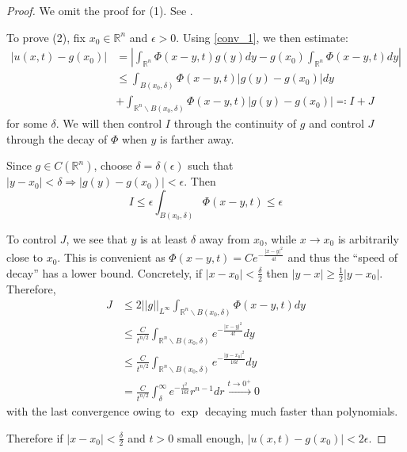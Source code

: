 \documentclass[openany, amssymb, psamsfonts]{amsart}
\theoremstyle{definition}
\numberwithin{equation}{section}
\newcommand{\bbr}{\mathbb{R}}
\let\implies\Rightarrow
\begin{document}
\begin{proof}
    We omit the proof for (1). See \cite{Evans}.

    To prove (2), fix $x_0 \in \bbr^n$ and $\epsilon > 0$. Using \autoref{conv_1}, we then estimate:
    \begin{align*}
        |u(x, t) - g(x_0)| &= |\int_{\bbr^n} \Phi(x-y, t) g(y) dy - g(x_0) \int_{\bbr^n} \Phi(x-y, t) dy| \\
        &\leq \int_{B(x_0, \delta)} \Phi(x-y, t) |g(y) - g(x_0)| dy \\
        &+ \int_{\bbr^n \backslash B(x_0, \delta)} \Phi(x-y, t) |g(y) - g(x_0)| \eqqcolon I + J
    \end{align*}
    for some $\delta$. We will then control $I$ through the continuity of $g$ and control $J$ through the decay of $\Phi$ when $y$ is farther away.

    Since $g \in C(\bbr^n)$, choose $\delta = \delta(\epsilon)$ such that $|y- x_0| < \delta \implies |g(y) - g(x_0)| < \epsilon$. Then \[
    I \leq \epsilon \int_{B(x_0, \delta)} \Phi(x-y, t) \leq \epsilon
    \]

    To control $J$, we see that $y$ is at least $\delta$ away from $x_0$, while $x \to x_0$ is arbitrarily close to $x_0$. This is convenient as $\Phi(x-y, t) = C e^{-\frac{|x-y|^2}{4t}}$ and thus the ``speed of decay'' has a lower bound. Concretely, if $|x - x_0| < \frac{\delta}{2}$ then $|y-x| \geq \frac{1}{2} |y - x_0|$. Therefore,
    \begin{align*}
    J &\leq 2 ||g||_{L^\infty} \int_{\bbr^n \backslash B(x_0, \delta)} \Phi(x-y, t) dy \\
    &\leq \frac{C}{t^{n/2}}  \int_{\bbr^n \backslash B(x_0, \delta)} e^{-\frac{|x-y|^2}{4t}} dy \\
    &\leq \frac{C}{t^{n/2}}  \int_{\bbr^n \backslash B(x_0, \delta)} e^{-\frac{|y-x_0|^2}{16t}} dy \\
    &= \frac{C}{t^{n/2}} \int_{\delta}^{\infty} e^{-\frac{r^2}{16t}} r^{n-1} dr \xrightarrow{t \to 0^+} 0 
    \end{align*}
    with the last convergence owing to $\exp$ decaying much faster than polynomials.

    Therefore if $|x-x_0| < \frac{\delta}{2}$ and $t>0$ small enough, $|u(x, t) - g(x_0)| < 2\epsilon$.
\end{proof}
\end{document}
